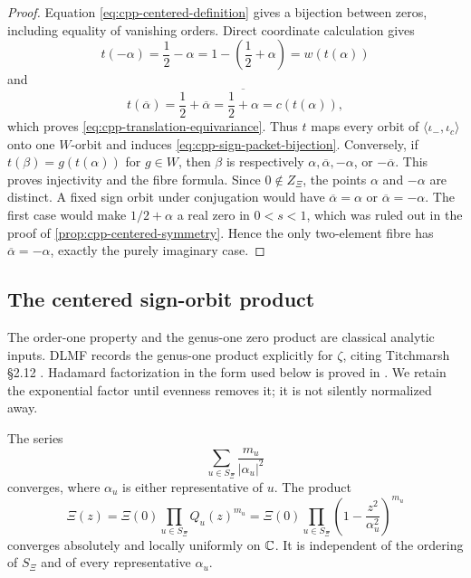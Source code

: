 \begin{proof}
Equation \eqref{eq:cpp-centered-definition} gives a bijection between zeros,
including equality of vanishing orders.  Direct coordinate calculation gives
\[
 t(-\alpha)=\frac12-\alpha
 =1-\left(\frac12+\alpha\right)=w(t(\alpha))
\]
and
\[
 t(\overline\alpha)
 =\frac12+\overline\alpha
 =\overline{\frac12+\alpha}=c(t(\alpha)),
\]
which proves \eqref{eq:cpp-translation-equivariance}.  Thus \(t\) maps every
orbit of \(\langle\iota_-,\iota_c\rangle\) onto one \(W\)-orbit and induces
\eqref{eq:cpp-sign-packet-bijection}.  Conversely, if
\(t(\beta)=g(t(\alpha))\) for \(g\in W\), then
\(\beta\) is respectively
\(\alpha,\overline\alpha,-\alpha\), or \(-\overline\alpha\).  This proves
injectivity and the fibre formula.  Since \(0\notin Z_\Xi\), the points
\(\alpha\) and \(-\alpha\) are distinct.  A fixed sign orbit under
conjugation would have \(\overline\alpha=\alpha\) or
\(\overline\alpha=-\alpha\).  The first case would make
\(1/2+\alpha\) a real zero in \(0<s<1\), which was ruled out in the proof of
\cref{prop:cpp-centered-symmetry}.  Hence the only two-element fibre has
\(\overline\alpha=-\alpha\), exactly the purely imaginary case.
\end{proof}

\subsection{The centered sign-orbit product}

The order-one property and the genus-one zero product are classical analytic
inputs.  DLMF records the genus-one product explicitly for \(\zeta\), citing
Titchmarsh \S2.12
\cite[\S25.2(iv), Eq.~25.2.12]{apostolDLMF25}.  Hadamard factorization in the
form used below is proved in
\cite[Theorems~3.14--3.15, pp.~79--82]{mcMullen2023AdvancedComplex}.
We retain the exponential factor until evenness removes it; it is not silently
normalized away.

\begin{theorem}
\label{thm:cpp-centered-product}
The series
\begin{equation}
\label{eq:cpp-reciprocal-square-sum}
 \sum_{u\in S_\Xi}\frac{m_u}{|\alpha_u|^2}
\end{equation}
converges, where \(\alpha_u\) is either representative of \(u\).  The product
\begin{equation}
\label{eq:cpp-centered-product}
 \Xi(z)
 =
 \Xi(0)\prod_{u\in S_\Xi}Q_u(z)^{m_u}
 =
 \Xi(0)\prod_{u\in S_\Xi}
 \left(1-\frac{z^2}{\alpha_u^2}\right)^{m_u}
\end{equation}
converges absolutely and locally uniformly on \(\mathbb C\).  It is independent of
the ordering of \(S_\Xi\) and of every representative \(\alpha_u\).
\end{theorem}

